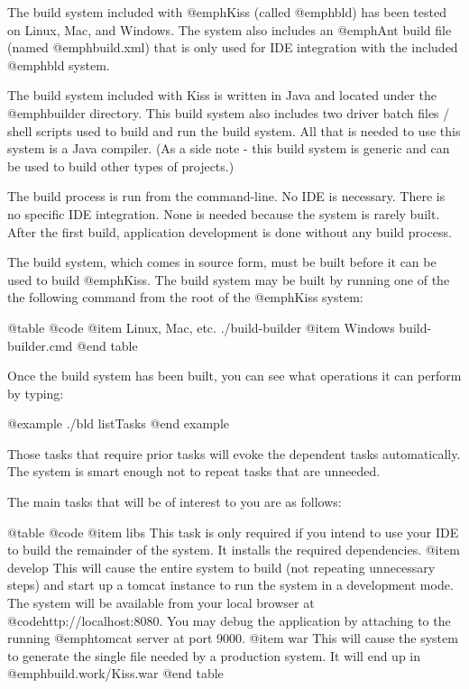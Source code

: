 The build system included with @emph{Kiss} (called @emph{bld}) has
been tested on Linux, Mac, and Windows.  The system also includes an
@emph{Ant} build file (named @emph{build.xml}) that is only used for
IDE integration with the included @emph{bld} system.

The build system included with Kiss is written in Java and located
under the @emph{builder} directory.  This build system also includes
two driver batch files / shell scripts used to build and run the build
system.  All that is needed to use this system is a Java compiler.
(As a side note - this build system is generic and can be used to
build other types of projects.)

The build process is run from the command-line.  No IDE is necessary.
There is no specific IDE integration.  None is needed because the system
is rarely built.  After the first build, application development is done
without any build process.

The build system, which comes in source form, must be built before it
can be used to build @emph{Kiss}.  The build system may be built by
running one of the the following command from the root of the
@emph{Kiss} system:

@table @code
@item Linux, Mac, etc.
./build-builder
@item Windows
build-builder.cmd
@end table

Once the build system has been built, you can see what operations it
can perform by typing:

@example
    ./bld listTasks
@end example

Those tasks that require prior tasks will evoke the dependent tasks
automatically.  The system is smart enough not to repeat tasks that
are unneeded.

The main tasks that will be of interest to you are as follows:

@table @code
@item libs
This task is only required if you intend to use your IDE to build the
remainder of the system.  It installs the required dependencies.
@item develop
This will cause the entire system to build (not repeating unnecessary
steps) and start up a tomcat instance to run the system in a
development mode.  The system will be available from your local
browser at @code{http://localhost:8080}.  You may debug the
application by attaching to the running @emph{tomcat} server at port
9000.
@item war
This will cause the system to generate the single file needed by a
production system.  It will end up in @emph{build.work/Kiss.war}
@end table

